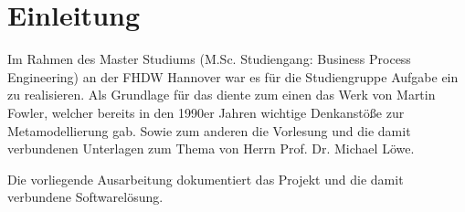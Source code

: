 \section{Einleitung}

Im Rahmen des Master Studiums (M.Sc. Studiengang: Business Process Engineering) an der FHDW Hannover
war es für die Studiengruppe  Aufgabe ein \MM zu realisieren. Als Grundlage für das \MM diente zum einen das Werk 
  von Martin Fowler, welcher bereits in den 1990er Jahren wichtige Denkanstöße zur Metamodellierung gab. 
Sowie zum anderen die Vorlesung und die damit verbundenen Unterlagen  zum Thema  von Herrn Prof. Dr. Michael Löwe. 

Die vorliegende Ausarbeitung dokumentiert das Projekt \qq{\MM} und die damit verbundene Softwarelösung.